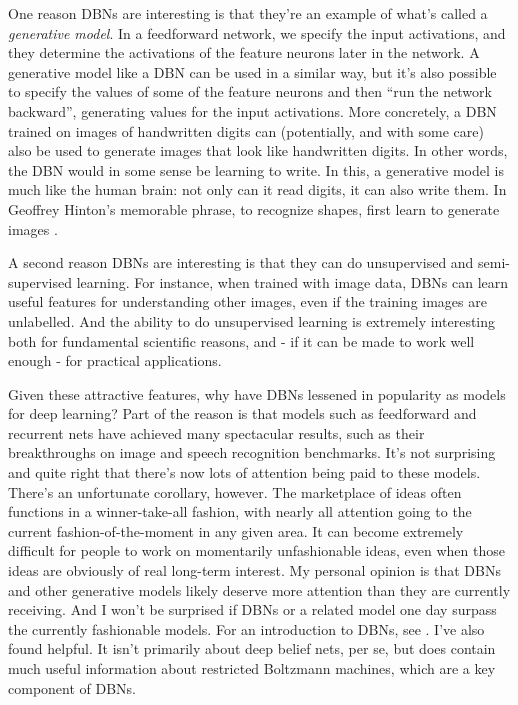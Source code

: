 One reason DBNs are interesting is that they're an example of what's called a \textit{generative model}. In a feedforward network, we specify the input activations, and they determine the activations of the feature neurons later in the network. A generative model like a DBN can be used in a similar way, but it's also possible to specify the values of some of the feature neurons and then ``run the network backward'', generating values for the input activations. More concretely, a DBN trained on images of handwritten digits can (potentially, and with some care) also be used to generate images that look like handwritten digits. In other words, the DBN would in some sense be learning to write. In this, a generative model is much like the human brain: not only can it read digits, it can also write them. In Geoffrey Hinton's memorable phrase, to recognize shapes, first learn to generate images \cite{Hinton2007ToRS}.


A second reason DBNs are interesting is that they can do unsupervised and semi-supervised learning. For instance, when trained with image data, DBNs can learn useful features for understanding other images, even if the training images are unlabelled. And the ability to do unsupervised learning is extremely interesting both for fundamental scientific reasons, and - if it can be made to work well enough - for practical applications.

Given these attractive features, why have DBNs lessened in popularity as models for deep learning? Part of the reason is that models such as feedforward and recurrent nets have achieved many spectacular results, such as their breakthroughs on image and speech recognition benchmarks. It's not surprising and quite right that there's now lots of attention being paid to these models. There's an unfortunate corollary, however. The marketplace of ideas often functions in a winner-take-all fashion, with nearly all attention going to the current fashion-of-the-moment in any given area. It can become extremely difficult for people to work on momentarily unfashionable ideas, even when those ideas are obviously of real long-term interest. My personal opinion is that DBNs and other generative models likely deserve more attention than they are currently receiving. And I won't be surprised if DBNs or a related model one day surpass the currently fashionable models. For an introduction to DBNs, see \cite{HintonDBN2009}. I've also found \cite{Hintonpracguide2010} helpful. It isn't primarily about deep belief nets, per se, but does contain much useful information about restricted Boltzmann machines, which are a key component of DBNs.
 

